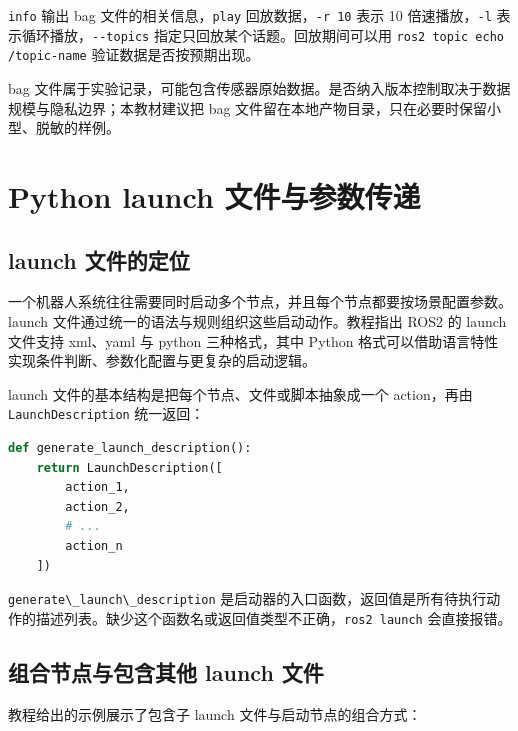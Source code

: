 \passthrough{\lstinline!info!} 输出 bag
文件的相关信息，\passthrough{\lstinline!play!}
回放数据，\passthrough{\lstinline!-r 10!} 表示 10
倍速播放，\passthrough{\lstinline!-l!}
表示循环播放，\passthrough{\lstinline!--topics!}
指定只回放某个话题。回放期间可以用
\passthrough{\lstinline!ros2 topic echo /topic-name!}
验证数据是否按预期出现。

bag
文件属于实验记录，可能包含传感器原始数据。是否纳入版本控制取决于数据规模与隐私边界；本教材建议把
bag 文件留在本地产物目录，只在必要时保留小型、脱敏的样例。

\section{Python launch
文件与参数传递}\label{python-launch-ux6587ux4ef6ux4e0eux53c2ux6570ux4f20ux9012}

\subsection{launch
文件的定位}\label{launch-ux6587ux4ef6ux7684ux5b9aux4f4d}

一个机器人系统往往需要同时启动多个节点，并且每个节点都要按场景配置参数。launch
文件通过统一的语法与规则组织这些启动动作。教程指出 ROS2 的 launch
文件支持 xml、yaml 与 python 三种格式，其中 Python
格式可以借助语言特性实现条件判断、参数化配置与更复杂的启动逻辑。

launch 文件的基本结构是把每个节点、文件或脚本抽象成一个 action，再由
\passthrough{\lstinline!LaunchDescription!} 统一返回：

\begin{lstlisting}[language=Python]
def generate_launch_description():
    return LaunchDescription([
        action_1,
        action_2,
        # ...
        action_n
    ])
\end{lstlisting}

\passthrough{\lstinline!generate\_launch\_description!}
是启动器的入口函数，返回值是所有待执行动作的描述列表。缺少这个函数名或返回值类型不正确，\passthrough{\lstinline!ros2 launch!}
会直接报错。

\subsection{组合节点与包含其他 launch
文件}\label{ux7ec4ux5408ux8282ux70b9ux4e0eux5305ux542bux5176ux4ed6-launch-ux6587ux4ef6}

教程给出的示例展示了包含子 launch 文件与启动节点的组合方式：

